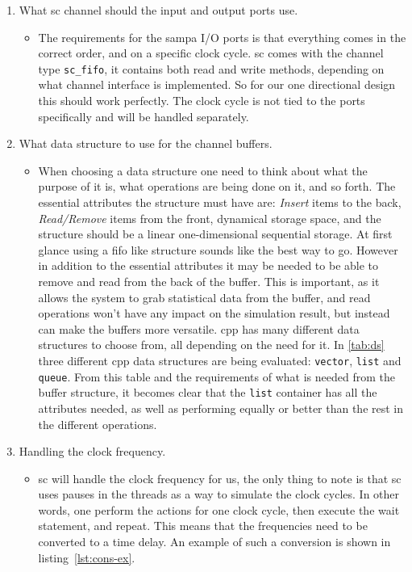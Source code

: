 \documentclass[a4paper, 12pt]{report}\dfrac{\right }{•}
\newcommand{\codeword}[1]{\texttt{#1}}
\begin{document}
\begin{enumerate}
	\item What \gls{sc} channel should the input and output ports use.
	
		\begin{itemize}
		\item The requirements for the \gls{sampa} I/O ports is that everything comes in the correct order, and on a specific clock cycle.
		\gls{sc} comes with the channel type \codeword{sc\_fifo}, it contains both read and write methods, depending on what channel interface is implemented.
		So for our one directional design this should work perfectly.
		The clock cycle is not tied to the ports specifically and will be handled separately.
		\end{itemize}	
		
	\item What data structure to use for the channel buffers.
		\begin{itemize}
\item When choosing a data structure one need to think about what the purpose of it is, what operations are being done on it, and so forth.
		The essential attributes the structure must have are: \textit{Insert} items to the back, \textit{Read/Remove} items from the front, dynamical storage space, and the structure should be a linear one-dimensional sequential storage.
		At first glance using a \gls{fifo} like structure sounds like the best way to go.
		However in addition to the essential attributes it may be needed to be able to remove and read from the back of the buffer.
		This is important, as it allows the system to grab statistical data from the buffer, and read operations won't have any impact on the simulation result, but instead can make the buffers more versatile.
		\gls{cpp} has many different data structures to choose from, all depending on the need for it.		
		In \ref{tab:ds} three different \gls{cpp} data structures are being evaluated: \codeword{vector}, \codeword{list} and \codeword{queue}.
		From this table and the requirements of what is needed from the buffer structure, it becomes clear that the \codeword{list} container has all the attributes needed, as well as performing equally or better than the rest in the different operations.
\end{itemize}
	\item Handling the clock frequency.
		\begin{itemize}
		\item \gls{sc} will handle the clock frequency for us, the only thing to note is that \gls{sc} uses pauses in the threads as a way to simulate the clock cycles.
		In other words, one perform the actions for one clock cycle, then execute the wait statement, and repeat.
		This means that the frequencies need to be converted to a time delay.	
		An example of such a conversion is shown in listing~\ref{lst:cons-ex}.
		\end{itemize}	
	
\end{enumerate}
\end{document}
